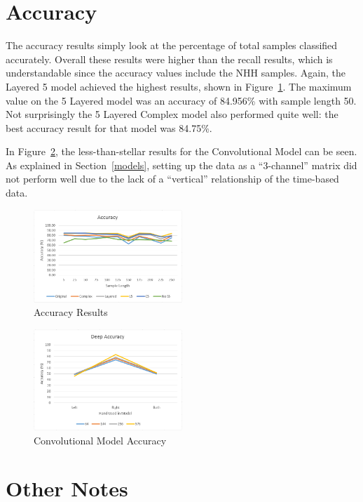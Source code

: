 \documentclass[]{report}
\begin{document}
\section{Accuracy}

The accuracy results simply look at the percentage of total samples classified accurately. Overall these results were higher than the recall results, which is understandable since the accuracy values include the NHH samples. Again, the Layered 5 model achieved the highest results, shown in Figure~\ref{accuracy}. The maximum value on the 5 Layered model was an accuracy of 84.956\% with sample length 50. Not surprisingly the 5 Layered Complex model also performed quite well: the best accuracy result for that model was 84.75\%.

In Figure~\ref{acuracy-deep}, the less-than-stellar results for the Convolutional Model can be seen. As explained in Section~\ref{models}, setting up the data as a ``3-channel'' matrix did not perform well due to the lack of a ``vertical'' relationship of the time-based data.
\begin{figure}
	\centering
	\includegraphics[width=0.5\textwidth]{../images/accuracy2}
	\caption{Accuracy Results}
	\label{accuracy}
\end{figure}
\begin{figure}
	\centering
	\includegraphics[width=0.5\textwidth]{../images/deepresults}
	\caption{Convolutional Model Accuracy}
	\label{acuracy-deep}
\end{figure}

\section{Other Notes}
\end{document}
